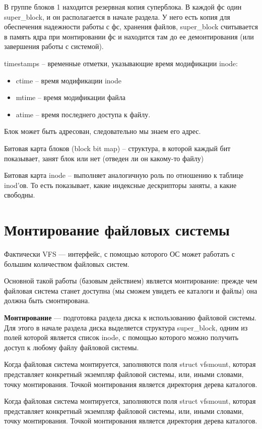 В группе блоков 1 находится резервная копия суперблока. В каждой фс один super\_block, и он располагается в начале раздела. У него есть копия для обеспечения надежности работы с фс, хранения файлов, super\_block считывается в память ядра при монтировании фс и находится там до ее демонтирования (или завершения работы с системой).

timestamps -- временные отметки, указывающие время модификации inode: 
\begin{itemize}
\item ctime -- время модификации inode
\item mtime -- время модификации файла
\item atime -- время последнего доступа к файлу.
\end{itemize}

Блок может быть адресован, следовательно мы знаем его адрес.

Битовая карта блоков (block bit map) -- структура, в которой каждый бит показывает, занят блок или нет (отведен ли он какому-то файлу)

Битовая карта inode -- выполняет аналогичную роль по отношению к таблице inod'ов. То есть показывает, какие индексные дескрипторы заняты, а какие свободны.

\section{Монтирование файловых системы}

Фактически VFS — интерфейс, с помощью которого ОС может работать с большим количеством файловых систем.

Основной такой работы (базовым действием) является монтирование: прежде чем файловая система станет доступна (мы сможем увидеть ее каталоги и файлы) она должна быть смонтирована.

\textbf{Монтирование} — подготовка раздела диска к использованию файловой системы. Для этого в начале раздела диска выделяется структура super\_block, одним из полей которой является список inode, с помощью которого можно получить доступ к любому файлу файловой системы.

Когда файловая система монтируется, заполняются поля struct vfsmount, которая представляет конкретный экземпляр файловой системы, или, иными словами, точку монтирования. Точкой монтирования является директория дерева каталогов.

Когда файловая система монтируется, заполняются поля struct vfsmount, которая представляет конкретный экземпляр файловой системы, или, иными словами, точку монтирования. Точкой монтирования является директория дерева каталогов.

